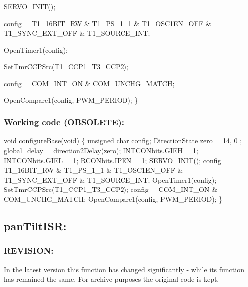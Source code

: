 \documentclass[]{article}
\begin{document}
	SERVO\_INIT();\newline
	
	config = T1\_16BIT\_RW \& T1\_PS\_1\_1 \& T1\_OSC1EN\_OFF \& T1\_SYNC\_EXT\_OFF \& T1\_SOURCE\_INT;\newline
	
	OpenTimer1(config);\newline
	
	SetTmrCCPSrc(T1\_CCP1\_T3\_CCP2);\newline
	
	config = COM\_INT\_ON \& COM\_UNCHG\_MATCH;\newline
	
	OpenCompare1(config, PWM\_PERIOD);\newline
\}\newline

\subsubsection{Working code (OBSOLETE):}
void configureBase(void) \newline
\{ \newline
unsigned char config; \newline
DirectionState zero = { 14, 0 }; \newline
global\_delay = direction2Delay(zero);\newline
INTCONbits.GIEH = 1;\newline
INTCONbits.GIEL = 1;\newline
RCONbits.IPEN = 1;\newline
SERVO\_INIT();\newline
config = T1\_16BIT\_RW \& T1\_PS\_1\_1 \& T1\_OSC1EN\_OFF \& T1\_SYNC\_EXT\_OFF \& T1\_SOURCE\_INT; \newline
OpenTimer1(config);\newline
SetTmrCCPSrc(T1\_CCP1\_T3\_CCP2);\newline
config = COM\_INT\_ON \& COM\_UNCHG\_MATCH;\newline
OpenCompare1(config, PWM\_PERIOD);\newline
\}

\subsection{panTiltISR:}
\subsubsection{REVISION:}
In the latest version this function has changed significantly - while its function has remained the same. For archive purposes the original code is kept.
\end{document}
